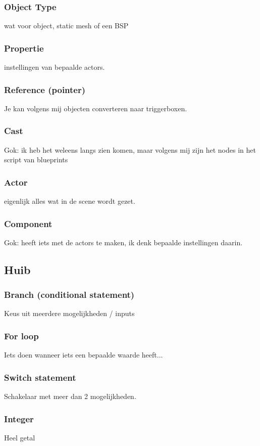 \subsubsection*{Object Type}
wat voor object, static mesh of een BSP
\subsubsection*{Propertie}
instellingen van bepaalde actors.
\subsubsection*{Reference (pointer)}
Je kan volgens mij objecten converteren naar triggerboxen.
\subsubsection*{Cast}
Gok: ik heb het weleens langs zien komen, maar volgens mij zijn het nodes in het script van blueprints
\subsubsection*{Actor}
eigenlijk alles wat in de scene wordt gezet.
\subsubsection*{Component}
Gok: heeft iets met de actors te maken, ik denk bepaalde instellingen daarin.

\subsection*{Huib}
\subsubsection*{Branch (conditional statement)}
Keus uit meerdere mogelijkheden / inputs
\subsubsection*{For loop}
Iets doen wanneer iets een bepaalde waarde heeft...
\subsubsection*{Switch statement}
Schakelaar met meer dan 2 mogelijkheden.
\subsubsection*{Integer}
Heel getal
